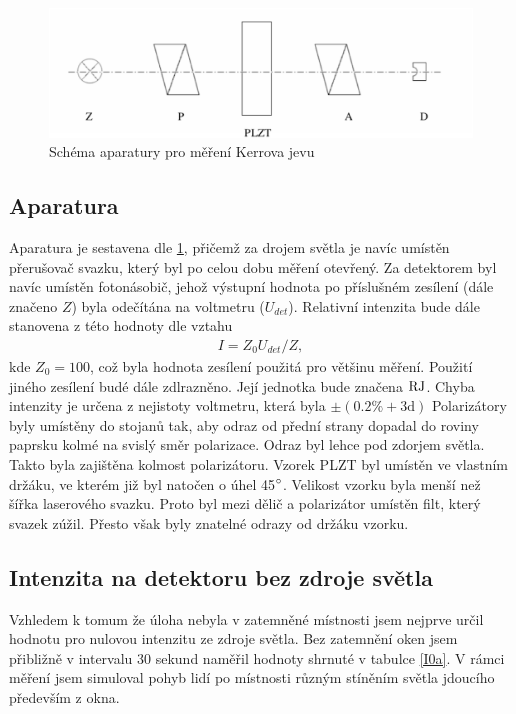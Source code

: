 \documentclass[a4paper,12pt]{article}
\begin{document}
\begin{figure}
\begin{center}
\includegraphics[width=6in]{obr2.eps}
\end{center}
\caption{Schéma aparatury pro měření Kerrova jevu}
\label{Obr2}
\end{figure}


\subsection{Aparatura}
Aparatura je sestavena dle \ref{Obr2}, přičemž za drojem světla je navíc umístěn přerušovač svazku, který byl po celou dobu měření otevřený. Za detektorem byl navíc 
umístěn fotonásobič, jehož výstupní hodnota po příslušném zesílení (dále značeno $Z$) byla odečítána na voltmetru ($U_{det}$). Relativní intenzita bude dále 
stanovena z této hodnoty dle vztahu
\begin{eqnarray}
I=Z_0U_{det}/Z,
\end{eqnarray}
kde $Z_0=100$, což byla hodnota zesílení použitá pro většinu měření. Použití jiného zesílení budé dále zdlrazněno. Její jednotka bude značena $\mbox{RJ}$.
Chyba intenzity je určena z nejistoty voltmetru, která byla $\pm(0.2 \% + 3\mbox{d})$
Polarizátory byly umístěny do stojanů tak, aby odraz od přední strany dopadal do roviny paprsku kolmé na svislý směr polarizace. Odraz byl 
lehce pod zdorjem světla. Takto byla zajištěna kolmost polarizátoru. Vzorek PLZT byl umístěn ve vlastním držáku, ve kterém již byl natočen o úhel 45$^{\circ}$. 
Velikost vzorku byla menší než šířka laserového svazku.
Proto byl mezi dělič a polarizátor umístěn filt, který svazek zúžil. Přesto však byly znatelné odrazy od držáku vzorku.

\subsection{Intenzita na detektoru bez zdroje světla}
Vzhledem k tomum že úloha nebyla v zatemněné místnosti jsem nejprve určil hodnotu pro nulovou intenzitu ze zdroje světla. Bez zatemnění oken jsem přibližně v intervalu 
30 sekund naměřil hodnoty shrnuté v tabulce \ref{I0a}. V rámci měření jsem simuloval pohyb lidí po místnosti různým stíněním světla jdoucího především z okna.
\end{document}
